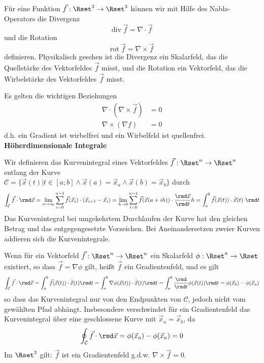 \documentclass[a4paper,10pt]{article}
\begin{document}
Für eine Funktion $\vec{f}:\Rset^3\to\Rset^3$ können wir mit Hilfe des
Nabla-Operators die Divergenz
\[
{\mathrm{div}}~\vec{f}=\nabla\cdot\vec{f}
\]
und die Rotation
\[
{\mathrm{rot}}~\vec{f}=\nabla\times\vec{f}
\]
definieren.
Physikalisch gesehen ist die Divergenz ein Skalarfeld, das die Quellstärke
des Vektorfeldes $\vec{f}$ misst, und die Rotation ein Vektorfeld, das die
Wirbelstärke des Vektorfeldes $\vec{f}$ misst.

Es gelten die wichtigen Beziehungen
\begin{align*}
\nabla\cdot(\nabla\times\vec{f})&=0\\
\nabla\times(\nabla f)&=0
\end{align*}
d.h. ein Gradient ist wirbelfrei und ein Wirbelfeld ist quellenfrei.\\

{\bf Höherdimensionale Integrale}

Wir definieren das Kurvenintegral eines Vektorfeldes
$\vec{f}:\Rset^n\to\Rset^n$ entlang der Kurve\\
$\mathcal{C}=\{\vec{x}(t)|t\in[a;b]\wedge \vec{x}(a)=\vec{x}_a\wedge \vec{x}(b)=\vec{x}_b\}$ durch
\[
\int_\mathcal{C} \vec{f}\cdot\rmd\vec{x}
= \lim\limits_{n\to\infty}\sum_{i=0}^{n-1} \vec{f}(\vec{x}_i)\cdot(\vec{x}_{i+1}-\vec{x}_i)
= \lim\limits_{h\to 0}\sum_{i=0}^{n-1} \vec{f}(\vec{x}(a+ih))\cdot\frac{\rmd\vec{x}}{\rmd t}h
= \int_a^b \vec{f}(\vec{x}(t))\cdot\dot{\vec{x}}(t)~\rmd t
\]
Das Kurvenintegral bei umgekehrtem Durchlaufen der Kurve hat den gleichen Betrag und das entgegengesetzte Vorzeichen.
Bei Aneinandersetzen zweier Kurven addieren sich die Kurvenintegrale.

Wenn für ein Vektorfeld $\vec{f}:\Rset^n\to\Rset^n$ ein Skalarfeld
$\phi:\Rset^n\to\Rset$ existiert, so dass $\vec{f}=\nabla\phi$ gilt,
heißt $\vec{f}$ ein Gradientenfeld, und es gilt
\[
\int_\mathcal{C} \vec{f}\cdot\rmd\vec{x}
= \int_a^b \vec{f}(\vec{x}(t))\cdot\dot{\vec{x}}(t)\rmd t 
= \int_a^b \nabla\phi(\vec{x}(t))\cdot\dot{\vec{x}}(t)\rmd t
= \int_a^b \frac{\rmd}{\rmd t}\phi(\vec{x}(t)) \rmd t
= \phi(\vec{x}_b)-\phi(\vec{x}_a)
\]
so dass das Kurvenintegral nur von den Endpunkten von $\mathcal{C}$,
jedoch nicht vom gewählten Pfad abhängt.
Insbesondere verschwindet für ein Gradientenfeld das Kurvenintegral
über eine geschlossene Kurve mit $\vec{x}_a=\vec{x}_b$, da
\[
\oint_\mathcal{C} \vec{f}\cdot\rmd\vec{x} = \phi(\vec{x}_a)-\phi(\vec{x}_a)
 = 0
\]
Im $\Rset^3$ gilt: $\vec{f}$ ist ein Gradientenfeld g.d.w.
$\nabla\times\vec{f}=0$.\\
\end{document}
